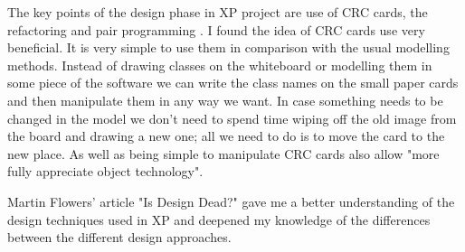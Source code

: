 \documentclass[]{report}
\begin{document}
The key points of the design phase in XP project are use of CRC cards, the refactoring and pair programming \cite{KeyPointsDesign}. I found the idea of CRC cards use very beneficial. It is very simple to use them in comparison with the usual modelling methods. Instead of drawing classes on the whiteboard or modelling them in some piece of the software we can write the class names on the small paper cards and then manipulate them in any way we want. In case something needs to be changed in the model we don't need to spend time wiping off the old image from the board and drawing a new one; all we need to do is to move the card to the new place. As well as being simple to manipulate CRC cards also allow "more fully appreciate object technology"\cite{CRC}. 

Martin Flowers' article "Is Design Dead?" gave me a better understanding of the design techniques used in XP and deepened my knowledge of the differences between the different design approaches.


\end{document}
